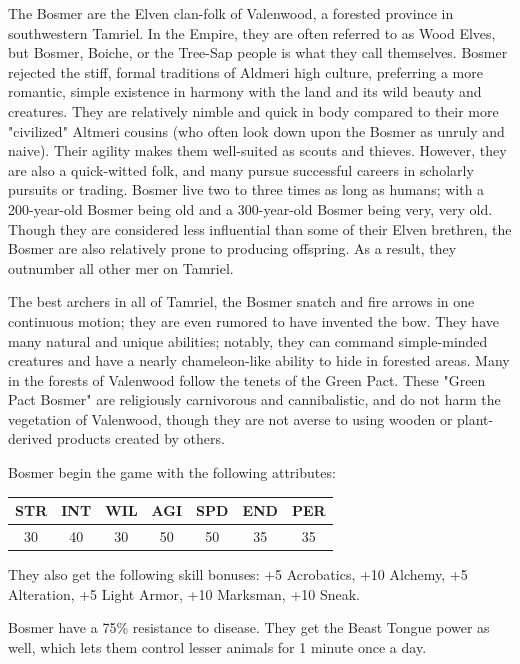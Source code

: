 \documentclass[12pt]{book}
\begin{document}
The Bosmer are the Elven clan-folk of Valenwood, a forested province in southwestern Tamriel. In the Empire, they are often referred to as Wood Elves, but Bosmer, Boiche, or the Tree-Sap people is what they call themselves. Bosmer rejected the stiff, formal traditions of Aldmeri high culture, preferring a more romantic, simple existence in harmony with the land and its wild beauty and creatures. They are relatively nimble and quick in body compared to their more "civilized" Altmeri cousins (who often look down upon the Bosmer as unruly and naive). Their agility makes them well-suited as scouts and thieves. However, they are also a quick-witted folk, and many pursue successful careers in scholarly pursuits or trading. Bosmer live two to three times as long as humans; with a 200-year-old Bosmer being old and a 300-year-old Bosmer being very, very old. Though they are considered less influential than some of their Elven brethren, the Bosmer are also relatively prone to producing offspring. As a result, they outnumber all other mer on Tamriel.

The best archers in all of Tamriel, the Bosmer snatch and fire arrows in one continuous motion; they are even rumored to have invented the bow. They have many natural and unique abilities; notably, they can command simple-minded creatures and have a nearly chameleon-like ability to hide in forested areas. Many in the forests of Valenwood follow the tenets of the Green Pact. These "Green Pact Bosmer" are religiously carnivorous and cannibalistic, and do not harm the vegetation of Valenwood, though they are not averse to using wooden or plant-derived products created by others.

Bosmer begin the game with the following attributes:
\begin{center}
\begin{tabular}{|c|c|c|c|c|c|c|}
\hline
STR & INT & WIL & AGI & SPD & END & PER\\ \hline
30 & 40 & 30 & 50 & 50 & 35 & 35\\ \hline
\end{tabular}
\end{center}

They also get the following skill bonuses: +5 Acrobatics, +10 Alchemy, +5 Alteration, +5 Light Armor, +10 Marksman, +10 Sneak.

Bosmer have a 75\% resistance to disease. They get the Beast Tongue power as well, which lets them control lesser animals for 1 minute once a day.\\
\end{document}
